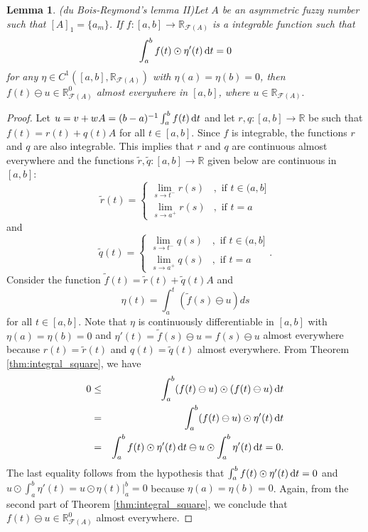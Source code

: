 \documentclass[12pt,a4paper]{article}
\newcommand{\RR}{\mathbb{R}}
\newcommand{\RFA}{\mathbb{R}_{\mathcal{F}(A)}}
\newtheorem{lemma}{Lemma}
\begin{document}
\begin{lemma}(du Bois-Reymond's lemma II)\label{lem:fundamental3} 
Let $A$ be an asymmetric fuzzy number such that $[A]_1 = \{a_m\}$. 
If $f:[a,b]\to \RFA$ is a integrable function such that 
\begin{equation}\label{eq:aux_p}
\int_{a}^{b}f(t) \odot \eta'(t)\,\textnormal{d}t=0	
\end{equation}
for any $\eta \in C^1\left([a,b],\RFA\right)$ with $\eta(a) = \eta(b)=0$, 
then $f(t) \ominus u \in \RFA^0$ almost everywhere in $[a,b]$, where  $u \in \RFA.$
\end{lemma}
\begin{proof}
Let $u = v + wA = (b-a)^{-1}\int^b_a f(t)\,\textnormal{d}t$ and let $r,q:[a,b]\to \RR$ be 
such that $f(t) = r(t) + q(t)A$ for all $t \in [a,b].$ 
Since $f$ is integrable, the functions $r$ and $q$ are also integrable. This implies that $r$ and $q$ are continuous almost everywhere and the functions $\tilde{r}, \tilde{q}:[a,b]\to \RR$ given below are continuous in $[a,b]$:
$$
\tilde{r}(t) = \left\lbrace\begin{array}{cl}
\lim_{s\to t^-} r(s)   &, \mbox{ if } t \in (a,b] \\
\lim_{s\to a^+} r(s)   &, \mbox{ if } t=a
\end{array}\right.
$$
and
$$
\tilde{q}(t) = \left\lbrace\begin{array}{cl}
\lim_{s\to t^-} q(s)   &, \mbox{ if } t \in (a,b] \\
\lim_{s\to a^+} q(s)   &, \mbox{ if } t=a
\end{array}\right..
$$ 
Consider the function $\tilde{f}(t) = \tilde{r}(t) + \tilde{q}(t)A$ and 
$$
\eta(t) = \int_a^t (\tilde{f}(s) \ominus u)ds
$$
for all $t \in [a,b].$
Note that  $\eta$ is continuously differentiable in $[a,b]$ with 
$\eta(a) = \eta(b) = 0$ and $\eta'(t) = \tilde{f}(s) \ominus u = f(s) \ominus u$ 
almost everywhere because $r(t) = \tilde{r}(t)$ and $q(t) = \tilde{q}(t)$ almost everywhere. 
From Theorem \ref{thm:integral_square}, we have 
\begin{eqnarray*}
0 & \leq & \int_{a}^{b}(f(t) \ominus u) \odot (f(t) \ominus u)\,\textnormal{d}t \\
 & = & \int_{a}^{b} (f(t) \ominus u) \odot \eta'(t) \,\textnormal{d}t \\
 & = & \int_{a}^{b} f(t) \odot \eta'(t) \,\textnormal{d}t \ominus u \odot \int_{a}^{b} \eta'(t) \,\textnormal{d}t = 0.  
\end{eqnarray*}
The last equality follows from the hypothesis that $\int_{a}^{b} f(t) \odot \eta'(t) \,\textnormal{d}t = 0$ and $u \odot \int_{a}^{b} \eta'(t) = u\odot \eta(t) \Big|_a^b = 0$ because 
$\eta(a)=\eta(b) =0$. 
Again, from the second part of Theorem \ref{thm:integral_square}, we conclude that 
$f(t) \ominus u \in \RFA^0$ almost everywhere. 
\end{proof}
\end{document}
